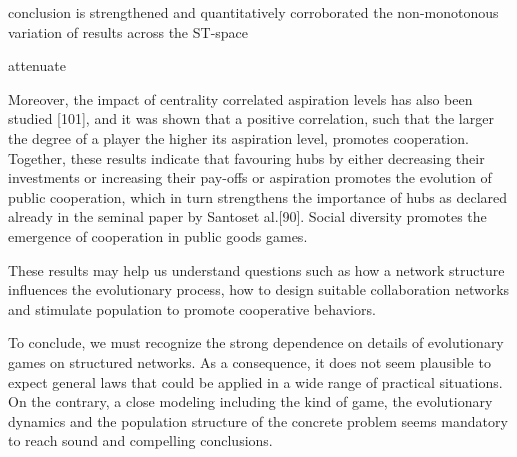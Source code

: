 \documentclass[preprint,12pt,3p]{elsarticle}
\begin{document}
conclusion is strengthened and quantitatively corroborated
the non-monotonous variation of results across the ST-space

attenuate

Moreover, the impact of centrality correlated aspiration levels has also been studied [101], and it was shown that a positive correlation, such that the larger the degree of a player the higher its aspiration level, promotes cooperation. Together, these results indicate that favouring hubs by either decreasing their investments or increasing their pay-offs or aspiration promotes the evolution of public cooperation, which in turn strengthens the importance of hubs as declared already in the seminal paper by Santoset al.[90]. Social diversity promotes the emergence of cooperation in public goods games.

These results may help us understand questions such as how a network structure influences the evolutionary
process, how to design suitable collaboration networks and stimulate population to promote cooperative behaviors.

To conclude, we must recognize the strong dependence on details of evolutionary games on structured networks.
As a consequence, it does not seem plausible to expect general laws that could be applied in a wide range of practical situations.
On the contrary, a close modeling including the
kind of game, the evolutionary dynamics and the population structure of the concrete problem seems mandatory to reach sound and compelling conclusions.




% 
% 
% 
% 
% 
% 
% 
% 
% 
% 
% 
% 


\end{document}

